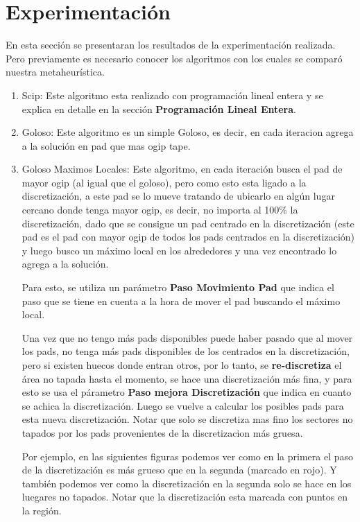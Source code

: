 \newpage
\section{Experimentación}\label{sec:experimentacion}

En esta secci\'on se presentaran los resultados de la experimentaci\'on realizada. Pero previamente es necesario conocer los algoritmos con los cuales se compar\'o nuestra metaheur\'istica.

\begin{enumerate}
\item Scip: Este algoritmo esta realizado con programaci\'on lineal entera y se explica en detalle en la secci\'on \textbf{Programaci\'on Lineal Entera}.
\item Goloso: Este algoritmo es un simple Goloso, es decir, en cada iteracion agrega a la soluci\'on en pad que mas ogip tape.
\item Goloso Maximos Locales: Este algoritmo, en cada iteraci\'on busca el pad de mayor ogip (al igual que el goloso), pero como esto esta ligado a la discretizaci\'on, a este pad se lo mueve tratando de ubicarlo en alg\'un lugar cercano donde tenga mayor ogip, es decir, no importa al 100\% la discretizaci\'on, dado que se consigue un pad centrado en la discretizaci\'on (este pad es el pad con mayor ogip de todos los pads centrados en la discretizaci\'on) y luego busco un m\'aximo local en los alrededores y una vez encontrado lo agrega a la soluci\'on.

Para esto, se utiliza un par\'ametro \textbf{Paso Movimiento Pad} que indica el paso que se tiene en cuenta a la hora de mover el pad buscando el m\'aximo local. 

Una vez que no tengo m\'as pads disponibles puede haber pasado que al mover los pads, no tenga m\'as pads disponibles de los centrados en la discretizaci\'on, pero si existen huecos donde entran otros, por lo tanto, se \textbf{re-discretiza} el \'area no tapada hasta el momento, se hace una discretizaci\'on m\'as fina, y para esto se usa el p\'arametro \textbf{Paso mejora Discretizaci\'on} que indica en cuanto se achica la discretizaci\'on. Luego se vuelve a calcular los posibles pads para esta nueva discretizaci\'on. Notar que solo se discretiza mas fino los sectores no tapados por los pads provenientes de la discretizacion m\'as gruesa.

Por ejemplo, en las siguientes figuras podemos ver como en la primera el paso de la discretizaci\'on es m\'as grueso que en la segunda (marcado en rojo). Y tambi\'en podemos ver como la discretizaci\'on en la segunda solo se hace en los luegares no tapados. Notar que la discretizaci\'on esta marcada con puntos en la regi\'on.


\end{enumerate}
